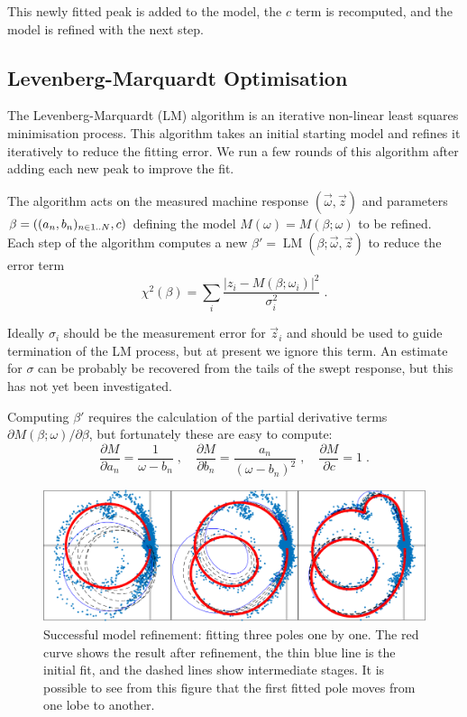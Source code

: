 \documentclass[
    a4paper,
    keeplastbox,            %
    hyphens,                %
    nospread,               %
    refpage,                %
]{jacow}
\newcommand{\squarecaption}[2][1]{\caption[#1]{#2\unskip\parfillskip 0pt}}
\newcommand{\dotdot}{\mathinner{\ldotp\ldotp}}
\begin{document}
This newly fitted peak is added to the model, the $c$ term is recomputed, and
the model is refined with the next step.


\subsection{Levenberg-Marquardt Optimisation}

\newcommand{\LM}{\operatorname{LM}}

The Levenberg-Marquardt (LM) algorithm\cite{levenberg, marquardt, recipies} is
an iterative non-linear least squares minimisation process.  This algorithm
takes an initial starting model and refines it iteratively to reduce the fitting
error.  We run a few rounds of this algorithm after adding each new peak to
improve the fit.

The algorithm acts on the measured machine response $(\vec\omega,\vec z)$ and
parameters $\beta=((a_n,b_n)_{n\in1\dotdot N},c)$ defining the model
$M(\omega)=M(\beta;\omega)$ to be refined.  Each step of the algorithm computes
a new $\beta'=\LM(\beta;\vec\omega,\vec{z})$ to reduce the error term
\[
    \chi^2(\beta) = \sum_i \frac{|z_i-M(\beta;\omega_i)|^2}{\sigma_i^2} \;.
\]

Ideally $\sigma_i$ should be the measurement error for $\vec{z}_i$ and should be
used to guide termination of the LM process, but at present we ignore this term.
An estimate for $\sigma$ can be probably be recovered from the tails of the
swept response, but this has not yet been investigated.

Computing $\beta'$ requires the calculation of the partial derivative terms
$\partial M(\beta;\omega)/ \partial\beta$, but fortunately these are
easy to compute:
\[
    \frac{\partial M}{\partial a_n} = \frac{1}{\omega-b_n} \;,\quad
    \frac{\partial M}{\partial b_n} = \frac{a_n}{(\omega-b_n)^2} \;,\quad
    \frac{\partial M}{\partial c} = 1 \;.
\]


\begin{figure}[ht]
\includegraphics[width=\linewidth]{WECO03f3.png}
\squarecaption{%
Successful model refinement: fitting three poles one by one.  The red curve
shows the result after refinement, the thin blue line is the initial fit, and
the dashed lines show intermediate stages.  It is possible to see from this
figure that the first fitted pole moves from one lobe to another.
}
\label{fig:refine-ok}
\end{figure}
\end{document}
